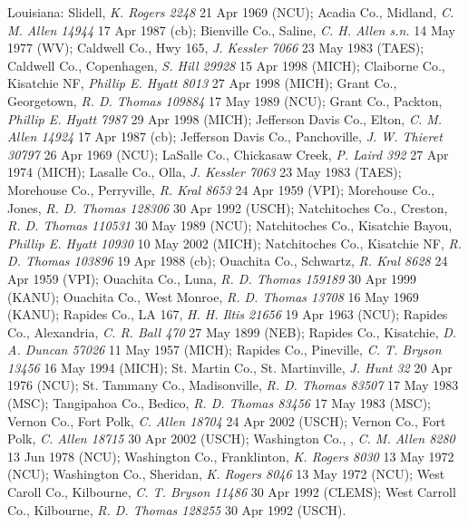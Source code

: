 \documentclass{article}
\begin{document}
Louisiana:
Slidell, \textit{K. Rogers 2248} 21 Apr 1969 (NCU);
Acadia Co., Midland, \textit{C. M. Allen 14944} 17 Apr 1987 (cb);
Bienville Co., Saline, \textit{C. H. Allen s.n.} 14 May 1977 (WV);
Caldwell Co., Hwy 165, \textit{J. Kessler 7066} 23 May 1983 (TAES);
Caldwell Co., Copenhagen, \textit{S. Hill 29928} 15 Apr 1998 (MICH);
Claiborne Co., Kisatchie NF, \textit{Phillip E. Hyatt 8013} 27 Apr 1998 (MICH);
Grant Co., Georgetown, \textit{R. D. Thomas 109884} 17 May 1989 (NCU);
Grant Co., Packton, \textit{Phillip E. Hyatt 7987} 29 Apr 1998 (MICH);
Jefferson Davis Co., Elton, \textit{C. M. Allen 14924} 17 Apr 1987 (cb);
Jefferson Davis Co., Panchoville, \textit{J. W. Thieret 30797} 26 Apr 1969 (NCU);
LaSalle Co., Chickasaw Creek, \textit{P. Laird 392} 27 Apr 1974 (MICH);
Lasalle Co., Olla, \textit{J. Kessler 7063} 23 May 1983 (TAES);
Morehouse Co., Perryville, \textit{R. Kral 8653} 24 Apr 1959 (VPI);
Morehouse Co., Jones, \textit{R. D. Thomas 128306} 30 Apr 1992 (USCH);
Natchitoches Co., Creston, \textit{R. D. Thomas 110531} 30 May 1989 (NCU);
Natchitoches Co., Kisatchie Bayou, \textit{Phillip E. Hyatt 10930} 10 May 2002 (MICH);
Natchitoches Co., Kisatchie NF, \textit{R. D. Thomas 103896} 19 Apr 1988 (cb);
Ouachita Co., Schwartz, \textit{R. Kral 8628} 24 Apr 1959 (VPI);
Ouachita Co., Luna, \textit{R. D. Thomas 159189} 30 Apr 1999 (KANU);
Ouachita Co., West Monroe, \textit{R. D. Thomas 13708} 16 May 1969 (KANU);
Rapides Co., LA 167, \textit{H. H. Iltis 21656} 19 Apr 1963 (NCU);
Rapides Co., Alexandria, \textit{C. R. Ball 470} 27 May 1899 (NEB);
Rapides Co., Kisatchie, \textit{D. A. Duncan 57026} 11 May 1957 (MICH);
Rapides Co., Pineville, \textit{C. T. Bryson 13456} 16 May 1994 (MICH);
St. Martin Co., St. Martinville, \textit{J. Hunt 32} 20 Apr 1976 (NCU);
St. Tammany Co., Madisonville, \textit{R. D. Thomas 83507} 17 May 1983 (MSC);
Tangipahoa Co., Bedico, \textit{R. D. Thomas 83456} 17 May 1983 (MSC);
Vernon Co., Fort Polk, \textit{C. Allen 18704} 24 Apr 2002 (USCH);
Vernon Co., Fort Polk, \textit{C. Allen 18715} 30 Apr 2002 (USCH);
Washington Co., , \textit{C. M. Allen 8280} 13 Jun 1978 (NCU);
Washington Co., Franklinton, \textit{K. Rogers 8030} 13 May 1972 (NCU);
Washington Co., Sheridan, \textit{K. Rogers 8046} 13 May 1972 (NCU);
West Caroll Co., Kilbourne, \textit{C. T. Bryson 11486} 30 Apr 1992 (CLEMS);
West Carroll Co., Kilbourne, \textit{R. D. Thomas 128255} 30 Apr 1992 (USCH).
\end{document}
